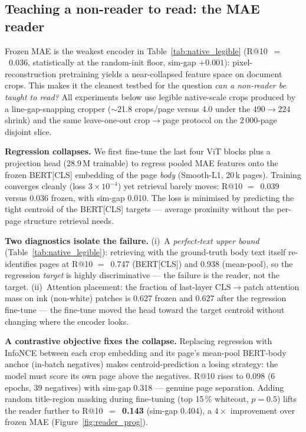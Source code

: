 \documentclass{article}
\begin{document}
\subsection{Teaching a non-reader to read: the MAE reader}
\label{sec:mae_reader}

Frozen MAE is the weakest encoder in
Table~\ref{tab:native_legible} (R@10~$=$~0.036, statistically at
the random-init floor, sim-gap $+0.001$): pixel-reconstruction
pretraining yields a near-collapsed feature space on document
crops. This makes it the cleanest testbed for the question
\emph{can a non-reader be taught to read?} All experiments below
use legible native-scale crops produced by a line-gap-snapping
cropper ($\sim$21.8 crops/page versus 4.0 under the
$490{\to}224$ shrink) and the same leave-one-out
crop$\rightarrow$page protocol on the 2\,000-page disjoint slice.

\textbf{Regression collapses.} We first fine-tune the last four
ViT blocks plus a projection head (28.9\,M trainable) to regress
pooled MAE features onto the frozen BERT[CLS] embedding of the
page \emph{body} (Smooth-L1, 20\,k pages). Training converges
cleanly (loss $3{\times}10^{-4}$) yet retrieval barely moves:
R@10 $=$~0.039 versus 0.036 frozen, with sim-gap 0.010. The loss
is minimised by predicting the tight centroid of the BERT[CLS]
targets --- average proximity without the per-page structure
retrieval needs.

\textbf{Two diagnostics isolate the failure.} (i)~A
\emph{perfect-text upper bound} (Table~\ref{tab:native_legible}):
retrieving with the ground-truth body text itself re-identifies
pages at R@10 $=$~0.747 (BERT[CLS]) and 0.938 (mean-pool), so the
regression \emph{target} is highly discriminative --- the failure
is the reader, not the target. (ii)~Attention placement: the
fraction of last-layer CLS$\rightarrow$patch attention mass on
ink (non-white) patches is 0.627 frozen and 0.627 after the
regression fine-tune --- the fine-tune moved the head toward the
target centroid without changing where the encoder looks.

\textbf{A contrastive objective fixes the collapse.} Replacing
regression with InfoNCE between each crop embedding and its
page's mean-pool BERT-body anchor (in-batch negatives) makes
centroid-prediction a losing strategy: the model must score its
own page above the negatives. R@10 rises to 0.098 (6 epochs, 39
negatives) with sim-gap 0.318 --- genuine page separation.
Adding random title-region masking during fine-tuning (top 15\,\%
whiteout, $p{=}0.5$) lifts the reader further to
R@10~$=$~\textbf{0.143} (sim-gap 0.404), a $4\times$ improvement
over frozen MAE (Figure~\ref{fig:reader_prog}).
\end{document}
